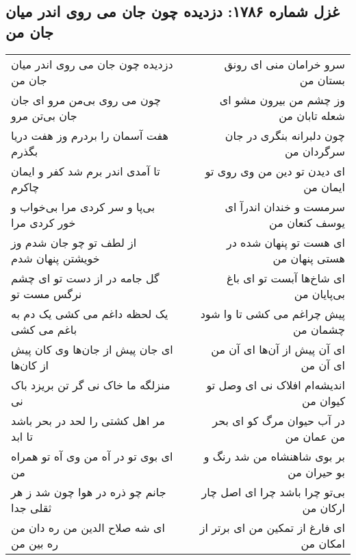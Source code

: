 \begin{center}
\section*{غزل شماره ۱۷۸۶: دزدیده چون جان می روی اندر میان جان من}
\label{sec:1786}
\begin{longtable}{l p{0.5cm} r}
دزدیده چون جان می روی اندر میان جان من
&&
سرو خرامان منی ای رونق بستان من
\\
چون می روی بی‌من مرو ای جان جان بی‌تن مرو
&&
وز چشم من بیرون مشو ای شعله تابان من
\\
هفت آسمان را بردرم وز هفت دریا بگذرم
&&
چون دلبرانه بنگری در جان سرگردان من
\\
تا آمدی اندر برم شد کفر و ایمان چاکرم
&&
ای دیدن تو دین من وی روی تو ایمان من
\\
بی‌پا و سر کردی مرا بی‌خواب و خور کردی مرا
&&
سرمست و خندان اندرآ ای یوسف کنعان من
\\
از لطف تو چو جان شدم وز خویشتن پنهان شدم
&&
ای هست تو پنهان شده در هستی پنهان من
\\
گل جامه در از دست تو ای چشم نرگس مست تو
&&
ای شاخ‌ها آبست تو ای باغ بی‌پایان من
\\
یک لحظه داغم می کشی یک دم به باغم می کشی
&&
پیش چراغم می کشی تا وا شود چشمان من
\\
ای جان پیش از جان‌ها وی کان پیش از کان‌ها
&&
ای آن پیش از آن‌ها ای آن من ای آن من
\\
منزلگه ما خاک نی گر تن بریزد باک نی
&&
اندیشه‌ام افلاک نی ای وصل تو کیوان من
\\
مر اهل کشتی را لحد در بحر باشد تا ابد
&&
در آب حیوان مرگ کو ای بحر من عمان من
\\
ای بوی تو در آه من وی آه تو همراه من
&&
بر بوی شاهنشاه من شد رنگ و بو حیران من
\\
جانم چو ذره در هوا چون شد ز هر ثقلی جدا
&&
بی‌تو چرا باشد چرا ای اصل چار ارکان من
\\
ای شه صلاح الدین من ره دان من ره بین من
&&
ای فارغ از تمکین من ای برتر از امکان من
\\
\end{longtable}
\end{center}
